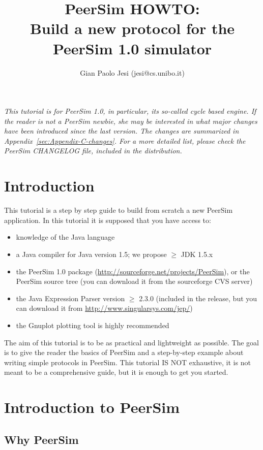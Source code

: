\documentclass[a4paper,11pt]{article}
\title{PeerSim HOWTO:\\ Build a new protocol for the PeerSim 1.0 simulator}
\author{Gian Paolo Jesi (jesi@cs.unibo.it)}
\begin{document}
\maketitle


\noindent\emph{This tutorial is for PeerSim 1.0, in particular, its so-called
cycle based engine.
If the reader is not a PeerSim newbie, she may be
interested in what major changes have been introduced since the last version.
The changes are summarized in Appendix~\ref{sec:Appendix-C-changes}.
For a more detailed list, please check the PeerSim CHANGELOG file, included in the
distribution.}

\section{Introduction}


This tutorial is a step by step guide to build from
scratch a new PeerSim application.
In this tutorial it is supposed that you have access to: 

\begin{itemize}
\item knowledge of the Java language
\item a Java compiler for Java version 1.5; we propose $\geq$ JDK 1.5.x
\item the PeerSim 1.0 package (\url{http://sourceforge.net/projects/PeerSim}), 
or the PeerSim source tree (you can download it from the sourceforge CVS server)
\item the Java Expression Parser version $\geq$ 2.3.0
(included in the release, but you can download it from
\url{http://www.singularsys.com/jep/})
\item the Gnuplot plotting tool is highly recommended 
\end{itemize}

The aim of this tutorial is to be
as practical and lightweight as possible.
The goal is to give the reader the basics
of PeerSim and a step-by-step example about writing simple
protocols in PeerSim.
This tutorial IS NOT exhaustive, it is not meant to be a comprehensive
guide, but it is enough to get you started.


\section{Introduction to PeerSim}


\subsection{Why PeerSim}
\end{document}
